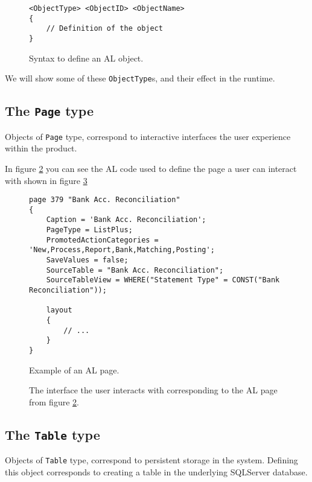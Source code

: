 \begin{figure}
    \begin{Verbatim}[fontsize=\small]
<ObjectType> <ObjectID> <ObjectName>
{
    // Definition of the object
}
    \end{Verbatim}
    \caption{Syntax to define an AL object.}
    \label{f:appendix-alobject}
\end{figure}

We will show some of these \texttt{ObjectType}s, and their effect in the runtime.

\subsection{The \texttt{Page} type}

Objects of \texttt{Page} type, correspond to interactive interfaces the user experience within the product.

In figure \ref{f:app-al-page-alcode} you can see the AL code used to define the page a user can interact with 
shown in figure \ref{f:app-al-page}

\begin{figure}
    \begin{Verbatim}[fontsize=\small]
page 379 "Bank Acc. Reconciliation"
{
    Caption = 'Bank Acc. Reconciliation';
    PageType = ListPlus;
    PromotedActionCategories = 'New,Process,Report,Bank,Matching,Posting';
    SaveValues = false;
    SourceTable = "Bank Acc. Reconciliation";
    SourceTableView = WHERE("Statement Type" = CONST("Bank Reconciliation"));

    layout
    {
        // ...
    }
}
    \end{Verbatim}
    \caption{Example of an AL page.}
    \label{f:app-al-page-alcode}
\end{figure}

\begin{figure}
    \caption{The interface the user interacts with corresponding to the AL page from figure \ref{f:app-al-page-alcode}.}
    \label{f:app-al-page}
\end{figure}

\subsection{The \texttt{Table} type}

Objects of \texttt{Table} type, correspond to persistent storage in the system. Defining this object corresponds
to creating a table in the underlying SQLServer database.

